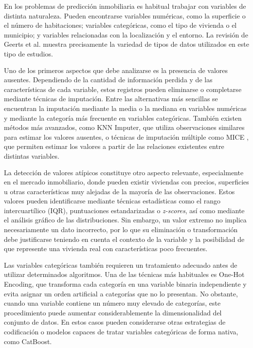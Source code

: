 \documentclass[IB]{TFUOC}%
\begin{document}
En los problemas de predicción inmobiliaria es habitual trabajar con variables de distinta naturaleza. Pueden encontrarse variables numéricas, como la superficie o el número de habitaciones; variables categóricas, como el tipo de vivienda o el municipio; y variables relacionadas con la localización y el entorno. La revisión de Geerts et al. \cite{houseprice_survey2023} muestra precisamente la variedad de tipos de datos utilizados en este tipo de estudios.

Uno de los primeros aspectos que debe analizarse es la presencia de valores ausentes. Dependiendo de la cantidad de información perdida y de las características de cada variable, estos registros pueden eliminarse o completarse mediante técnicas de imputación. Entre las alternativas más sencillas se encuentran la imputación mediante la media o la mediana en variables numéricas y mediante la categoría más frecuente en variables categóricas. También existen métodos más avanzados, como KNN Imputer, que utiliza observaciones similares para estimar los valores ausentes, o técnicas de imputación múltiple como MICE \cite{vanbuuren2011mice}, que permiten estimar los valores a partir de las relaciones existentes entre distintas variables.

La detección de valores atípicos constituye otro aspecto relevante, especialmente en el mercado inmobiliario, donde pueden existir viviendas con precios, superficies u otras características muy alejadas de la mayoría de las observaciones. Estos valores pueden identificarse mediante técnicas estadísticas como el rango intercuartílico (IQR), puntuaciones estandarizadas o \textit{z-scores}, así como mediante el análisis gráfico de las distribuciones. Sin embargo, un valor extremo no implica necesariamente un dato incorrecto, por lo que su eliminación o transformación debe justificarse teniendo en cuenta el contexto de la variable y la posibilidad de que represente una vivienda real con características poco frecuentes.

Las variables categóricas también requieren un tratamiento adecuado antes de utilizar determinados algoritmos. Una de las técnicas más habituales es One-Hot Encoding, que transforma cada categoría en una variable binaria independiente y evita asignar un orden artificial a categorías que no lo presentan. No obstante, cuando una variable contiene un número muy elevado de categorías, este procedimiento puede aumentar considerablemente la dimensionalidad del conjunto de datos. En estos casos pueden considerarse otras estrategias de codificación o modelos capaces de tratar variables categóricas de forma nativa, como CatBoost.
\end{document}
